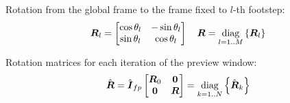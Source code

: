 \documentclass[12pt,a4paper]{article}
\begin{document}
Rotation from the global frame to the frame fixed to $l$-th footstep:
\begin{equation*}
    \mbox{\boldmath $R$}_l = 
    \begin{bmatrix}
        \cos{\theta_l}  &   -\sin{\theta_l} \\
        \sin{\theta_l}  &   \cos{\theta_l} \\
    \end{bmatrix}
    \quad
    \mbox{\boldmath $R$} = \underset{l = 1..M}{\operatorname{diag}}\left\{\mbox{\boldmath $R$}_l\right\}
\end{equation*}

Rotation matrices for each iteration of the preview window:
\begin{equation*}
    \hat{\mbox{\boldmath $R$}} = 
    \hat{\mbox{\boldmath $I$}}_{fp} 
    \begin{bmatrix}
        \mbox{\boldmath $R$}_0     &   \mbox{\boldmath $0$}\\
        \mbox{\boldmath $0$}       &   \mbox{\boldmath $R$}\\
    \end{bmatrix}
    = \underset{k = 1..N}{\operatorname{diag}}\left\{\hat{\mbox{\boldmath $R$}}_k\right\}
\end{equation*}













\end{document}
